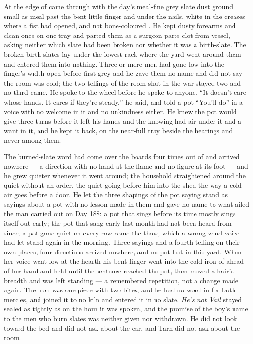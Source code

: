 \scenebreak

At the edge of   came through with the day's meal-fine grey slate dust ground small as meal past the bent little finger and under the nails, white in the creases where a fist had opened, and not bone-coloured . He kept dusty forearms and clean ones on one tray and parted them as a surgeon parts clot from vessel, asking neither which slate had been broken nor whether it was a birth-slate. The broken birth-slates lay under the lowest rack where the yard went around them and entered them into nothing. Three or more men had gone low into the finger's-width-open  before first grey and he gave them no name and did not say the room was cold; the two tellings of the room shut in the war stayed two and no third came. He spoke to the wheel before he spoke to anyone. “It doesn't care whose hands. It cares if they're steady,” he said, and told a pot “You'll do” in a voice with no welcome in it and no unkindness either. He knew  the pot would give three turns before it left his hands and the knowing had air under it and a want in it, and he kept it back, on the near-full tray beside the hearings and never among them.

The burned-slate word had come over the boards four times out of  and arrived nowhere --- a direction with no hand at the flame and no figure at its foot --- and he grew quieter whenever it went around; the household straightened around the quiet without an order, the quiet going before him into the shed the way a cold air goes before a door. He let the three shapings of the pot saying stand as sayings about a pot with no lesson made in them and gave no name to what ailed the man carried out on Day 188: a pot that sings before its time mostly sings itself out early; the pot that sang early last month had not been heard from since; a pot gone quiet on every row come the thaw, which a wrong-wind voice had let stand again in the morning. Three sayings and a fourth telling on their own places, four directions arrived nowhere, and no pot lost in this yard. When her voice went low at the hearth his bent finger went into the cold iron of  ahead of her hand and held until the sentence reached the pot, then moved a hair's breadth and was left standing --- a remembered repetition, not a change made again. The iron was one piece with two bites, and he had no word in  for both mercies, and joined it to no kiln and entered it in no slate. \emph{He's not Vail} stayed sealed as tightly as on the hour it was spoken, and the promise of the boy's name to the men who burn slates was neither given nor withdrawn. He did not look toward the bed and did not ask about the ear, and Tarn did not ask about the room.

